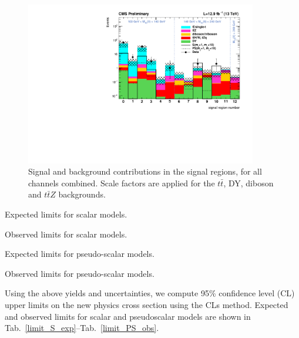   \begin{figure}
    \centering
    \includegraphics[width=0.9\textwidth]{figures/regions80X/DY-DD/TTZ-DD-Top16009/TTJets-DD/multiBoson-DD/all_bkgs.pdf}
    \caption{Signal and background contributions in the signal regions, for all channels combined. Scale factors are applied for the $t\bar{t}$, DY, diboson and $t\bar{t}Z$ backgrounds.}
    \label{fig:signalRegions-all}
  \end{figure}

  \begin{table}[ht]
  \begin{center}
  \caption{Expected limits for scalar models.}\label{limit_S_exp}
  
  \end{center}
  \end{table}

  \begin{table}[ht]
  \begin{center}
  \caption{Observed limits for scalar models.}\label{limit_S_obs}
  
  \end{center}
  \end{table}

  \begin{table}[ht]
  \begin{center}
  \caption{Expected limits for pseudo-scalar models.}\label{limit_PS_exp}
  
  \end{center}
  \end{table}

  \begin{table}[ht]
  \begin{center}
  \caption{Observed limits for pseudo-scalar models.}\label{limit_PS_obs}
  
  \end{center}
  \end{table}

  Using the above yields and uncertainties, we compute 95\% confidence level (CL) upper limits on the new physics cross section using the CLs method.
  Expected and observed limits for scalar and pseudoscalar models are shown in Tab.~\ref{limit_S_exp}--Tab.~\ref{limit_PS_obs}.

